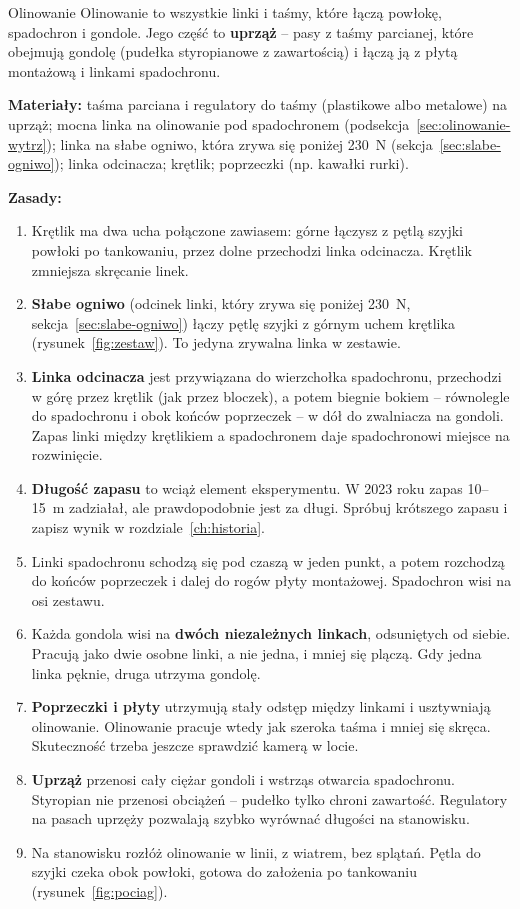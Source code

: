 \clearpage
\begin{sekcja}{Olinowanie}\label{sec:olinowanie}
Olinowanie to wszystkie linki i taśmy, które łączą powłokę, spadochron i gondole. Jego część to \textbf{uprząż} -- pasy z taśmy parcianej, które obejmują gondolę (pudełka styropianowe z zawartością) i łączą ją z płytą montażową i linkami spadochronu.

\textbf{Materiały:} taśma parciana i regulatory do taśmy (plastikowe albo metalowe) na uprząż; mocna linka na olinowanie pod spadochronem (podsekcja~\ref{sec:olinowanie-wytrz}); linka na słabe ogniwo, która zrywa się poniżej \SI{230}{N} (sekcja~\ref{sec:slabe-ogniwo}); linka odcinacza; krętlik; poprzeczki (np. kawałki rurki).

\textbf{Zasady:}
\begin{enumerate}
  \item Krętlik ma dwa ucha połączone zawiasem: górne łączysz z pętlą szyjki powłoki po tankowaniu, przez dolne przechodzi linka odcinacza. Krętlik zmniejsza skręcanie linek.
  \item \textbf{Słabe ogniwo} (odcinek linki, który zrywa się poniżej \SI{230}{N}, sekcja~\ref{sec:slabe-ogniwo}) łączy pętlę szyjki z górnym uchem krętlika (rysunek~\ref{fig:zestaw}). To jedyna zrywalna linka w zestawie.
  \item \textbf{Linka odcinacza} jest przywiązana do wierzchołka spadochronu, przechodzi w górę przez krętlik (jak przez bloczek), a potem biegnie bokiem -- równolegle do spadochronu i obok końców poprzeczek -- w dół do zwalniacza na gondoli. Zapas linki między krętlikiem a spadochronem daje spadochronowi miejsce na rozwinięcie.
  \item \textbf{Długość zapasu} to wciąż element eksperymentu. W 2023 roku zapas 10--15~m zadziałał, ale prawdopodobnie jest za długi. Spróbuj krótszego zapasu i zapisz wynik w rozdziale~\ref{ch:historia}.
  \item Linki spadochronu schodzą się pod czaszą w jeden punkt, a potem rozchodzą do końców poprzeczek i dalej do rogów płyty montażowej. Spadochron wisi na osi zestawu.
  \item Każda gondola wisi na \textbf{dwóch niezależnych linkach}, odsuniętych od siebie. Pracują jako dwie osobne linki, a nie jedna, i mniej się plączą. Gdy jedna linka pęknie, druga utrzyma gondolę.
  \item \textbf{Poprzeczki i płyty} utrzymują stały odstęp między linkami i usztywniają olinowanie. Olinowanie pracuje wtedy jak szeroka taśma i mniej się skręca. Skuteczność trzeba jeszcze sprawdzić kamerą w locie.
  \item \textbf{Uprząż} przenosi cały ciężar gondoli i wstrząs otwarcia spadochronu. Styropian nie przenosi obciążeń -- pudełko tylko chroni zawartość. Regulatory na pasach uprzęży pozwalają szybko wyrównać długości na stanowisku.
  \item Na stanowisku rozłóż olinowanie w linii, z wiatrem, bez splątań. Pętla do szyjki czeka obok powłoki, gotowa do założenia po tankowaniu (rysunek~\ref{fig:pociag}).
\end{enumerate}
\end{sekcja}

